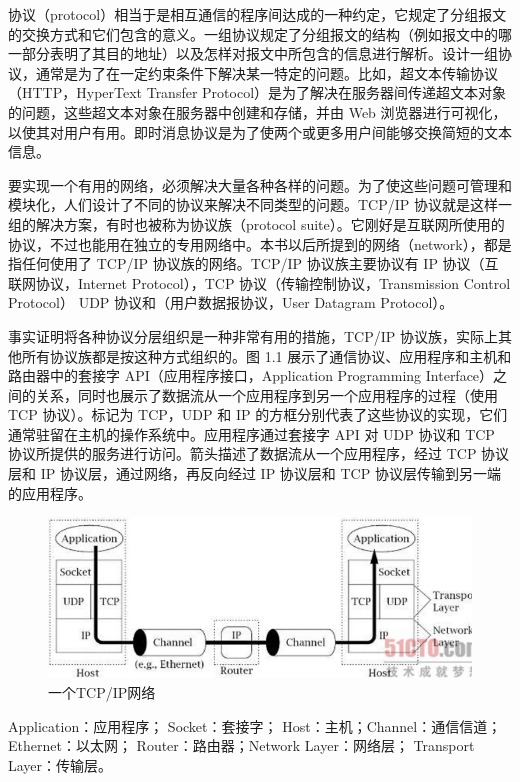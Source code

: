 		协议（protocol）相当于是相互通信的程序间达成的一种约定，它规定了分组报文的交换方式和它们包含的意义。一组协议规定了分组报文的结构（例如报文中的哪一部分表明了其目的地址）以及怎样对报文中所包含的信息进行解析。设计一组协议，通常是为了在一定约束条件下解决某一特定的问题。比如，超文本传输协议（HTTP，HyperText Transfer Protocol）是为了解决在服务器间传递超文本对象的问题，这些超文本对象在服务器中创建和存储，并由 Web 浏览器进行可视化，以使其对用户有用。即时消息协议是为了使两个或更多用户间能够交换简短的文本信息。

		要实现一个有用的网络，必须解决大量各种各样的问题。为了使这些问题可管理和模块化，人们设计了不同的协议来解决不同类型的问题。TCP/IP 协议就是这样一组的解决方案，有时也被称为协议族（protocol suite）。它刚好是互联网所使用的协议，不过也能用在独立的专用网络中。本书以后所提到的网络（network），都是指任何使用了 TCP/IP 协议族的网络。TCP/IP 协议族主要协议有 IP 协议（互联网协议，Internet Protocol），TCP 协议（传输控制协议，Transmission Control Protocol） UDP 协议和（用户数据报协议，User Datagram Protocol）。

		事实证明将各种协议分层组织是一种非常有用的措施，TCP/IP 协议族，实际上其他所有协议族都是按这种方式组织的。图 1.1 展示了通信协议、应用程序和主机和路由器中的套接字 API（应用程序接口，Application Programming Interface）之间的关系，同时也展示了数据流从一个应用程序到另一个应用程序的过程（使用 TCP 协议）。标记为 TCP，UDP 和 IP 的方框分别代表了这些协议的实现，它们通常驻留在主机的操作系统中。应用程序通过套接字 API 对 UDP 协议和 TCP 协议所提供的服务进行访问。箭头描述了数据流从一个应用程序，经过 TCP 协议层和 IP 协议层，通过网络，再反向经过 IP 协议层和 TCP 协议层传输到另一端的应用程序。

		\begin{figure}[htbp]%
			\centering
			\includegraphics[scale=.6]{img/01.01.png}
			\caption{一个TCP/IP网络}
			\label{fig:tcpip.net.trans}
		\end{figure}

		Application：应用程序； Socket：套接字； Host：主机；Channel：通信信道； Ethernet：以太网； Router：路由器；Network Layer：网络层； Transport Layer：传输层。

